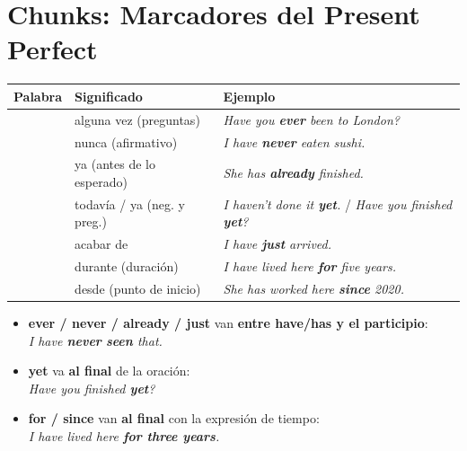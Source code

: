 \documentclass[12pt,a4paper]{article}
\begin{document}
\section{Chunks: Marcadores del Present Perfect}

\begin{cajachunk}
\begin{tabularx}{\textwidth}{@{} l l X @{}}
\toprule
\textbf{Palabra} & \textbf{Significado} & \textbf{Ejemplo} \\
\midrule
\eng{ever} & alguna vez (preguntas) & \textit{Have you \textbf{ever} been to London?} \\
\eng{never} & nunca (afirmativo) & \textit{I have \textbf{never} eaten sushi.} \\
\eng{already} & ya (antes de lo esperado) & \textit{She has \textbf{already} finished.} \\
\eng{yet} & todavía / ya (neg. y preg.) & \textit{I haven't done it \textbf{yet}.} / \textit{Have you finished \textbf{yet}?} \\
\eng{just} & acabar de & \textit{I have \textbf{just} arrived.} \\
\eng{for} & durante (duración) & \textit{I have lived here \textbf{for} five years.} \\
\eng{since} & desde (punto de inicio) & \textit{She has worked here \textbf{since} 2020.} \\
\bottomrule
\end{tabularx}

\medskip
\begin{cajaejemplo}
\begin{itemize}[nosep, leftmargin=0.8cm]
  \item \textbf{ever / never / already / just} van \textbf{entre have/has y el participio}:\\
    \textit{I have \textbf{never} \textbf{seen} that.}
  \item \textbf{yet} va \textbf{al final} de la oración:\\
    \textit{Have you finished \textbf{yet}?}
  \item \textbf{for / since} van \textbf{al final} con la expresión de tiempo:\\
    \textit{I have lived here \textbf{for three years}.}
\end{itemize}
\end{cajaejemplo}
\end{cajachunk}
\end{document}
